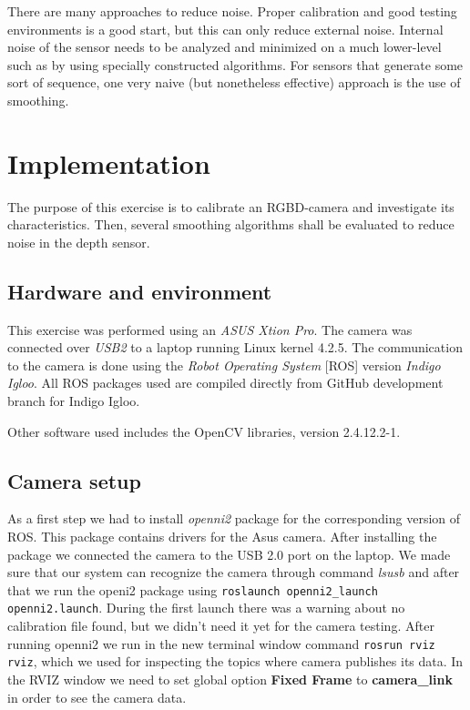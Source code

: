 \documentclass[11pt]{article}
\begin{document}
There are many approaches to reduce noise. Proper calibration and good testing environments is a good start, but this can only reduce external noise. Internal noise of the sensor needs to be analyzed and minimized on a much lower-level such as by using specially constructed algorithms. For sensors that generate some sort of sequence, one very naive (but nonetheless effective) approach is the use of smoothing. \par

\section{Implementation}
The purpose of this exercise is to calibrate an RGBD-camera and investigate its characteristics. Then, several smoothing algorithms shall be evaluated to reduce noise in the depth sensor.

\subsection{Hardware and environment}
This exercise was performed using an \emph{ASUS Xtion Pro}. The camera was connected over \emph{USB2} to a laptop running Linux kernel 4.2.5. The communication to the camera is done using the \emph{Robot Operating System} [ROS] version \emph{Indigo Igloo}. All ROS packages used are compiled directly from GitHub development branch for Indigo Igloo. \par
Other software used includes the OpenCV libraries, version 2.4.12.2-1.

\subsection{Camera setup}
As a first step we had to install \emph{openni2} package for the corresponding version of ROS. This package contains drivers for the Asus camera. After installing the package we connected the camera to the USB 2.0 port on the laptop. We made sure that our system can recognize the camera through command \emph{lsusb} and after that we run the openi2 package using \texttt{roslaunch openni2\_launch openni2.launch}. During the first launch there was a warning about no calibration file found, but we didn't need it yet for the camera testing. After running openni2 we run in the new terminal window command \texttt{rosrun rviz rviz}, which we used for inspecting the topics where camera publishes its data. In the RVIZ window we need to set global option \textbf{Fixed Frame} to \textbf{camera\_link} in order to see the camera data. \par
\end{document}
